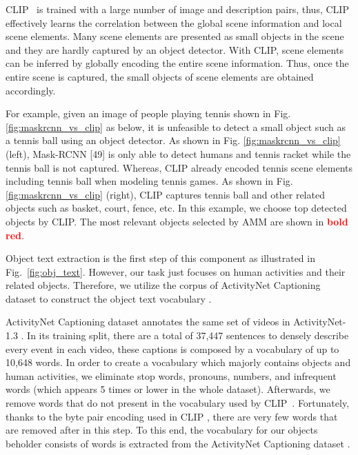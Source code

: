 \documentclass[sn-mathphys]{sn-jnl}
\theoremstyle{thmstyleone}\newtheorem{theorem}{Theorem}\newtheorem{proposition}[theorem]{Proposition}
\theoremstyle{thmstyletwo}\newtheorem{example}{Example}\newtheorem{remark}{Remark}
\theoremstyle{thmstylethree}\newtheorem{definition}{Definition}
\begin{document}
CLIP~\cite{radford2021learning} is trained with a large number of image and description pairs, thus, CLIP effectively learns the correlation between the global scene information and local scene elements. Many scene elements are presented as small objects in the scene and they are hardly captured by an object detector. With CLIP, scene elements can be inferred by globally encoding the entire scene information. Thus, once the entire scene is captured, the small objects of scene elements are obtained accordingly.

For example, given an image of people playing tennis shown in Fig. \ref{fig:maskrcnn_vs_clip} as below, it is unfeasible to detect a small object such as a tennis ball using an object detector. As shown in Fig. \ref{fig:maskrcnn_vs_clip} (left), Mask-RCNN [49] is only able to detect humans and tennis racket while the tennis ball is not captured. Whereas, CLIP already encoded tennis scene elements including tennis ball when modeling tennis games. As shown in Fig. \ref{fig:maskrcnn_vs_clip} (right), CLIP captures tennis ball and other related objects such as basket, court, fence, etc. In this example, we choose top  detected objects by CLIP. The most relevant objects selected by AMM are shown in \textcolor{red}{\textbf{bold red}}.



Object text extraction is the first step of this component as illustrated in Fig.~\ref{fig:obj_text}. However, our task just focuses on human activities and their related objects. Therefore, we utilize the corpus of ActivityNet Captioning dataset \cite{krishna2017dense} to construct the object text vocabulary .

ActivityNet Captioning dataset \cite{krishna2017dense} annotates the same set of videos in ActivityNet-1.3 \cite{caba2015activitynet}. In its training split, there are a total of 37,447 sentences to densely describe every event in each video, these captions is composed by a vocabulary of up to 10,648 words. In order to create a vocabulary which majorly contains objects and human activities, we eliminate stop words, pronouns, numbers, and infrequent words (which appears 5 times or lower in the whole dataset). Afterwards, we remove words that do not present in the vocabulary used by CLIP~\cite{radford2021learning}. Fortunately, thanks to the byte pair \cite{sennrich-etal-2016-neural} encoding used in CLIP \cite{radford2021learning}, there are very few words that are removed after in this step. To this end, the vocabulary for our objects beholder consists of  words is extracted from the ActivityNet Captioning dataset \cite{krishna2017dense}.
\end{document}
